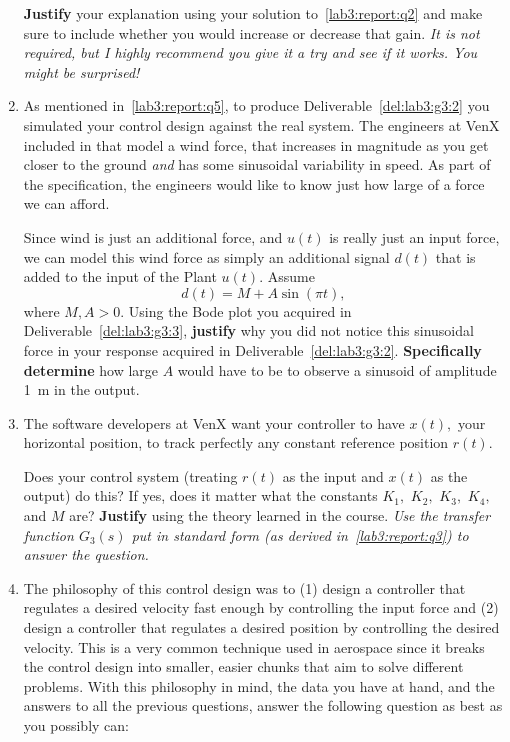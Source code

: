 \begin{deliverable}[label={lab3:report}]
\begin{enumerate}[label={(\arabic*)}]
{      \textbf{Justify} your explanation using your solution to~\ref{lab3:report:q2} and make sure to include whether you would increase or decrease that gain.
      \emph{It is not required, but I highly recommend you give it a try and see if it works. You might be surprised!}
      \label{lab3:report:q4}
    }
    \item{%
      As mentioned in~\ref{lab3:report:q5}, to produce Deliverable~\ref{del:lab3:g3:2} you simulated your control design against the real system.
      The engineers at VenX included in that model a wind force, that increases in magnitude as you get closer to the ground \emph{and} has some sinusoidal variability in speed.
      As part of the specification, the engineers would like to know just how large of a force we can afford.

      Since wind is just an additional force, and \(u(t)\) is really just an input force, we can model this wind force as simply an additional signal \(d(t)\) that is added to the input of the Plant \(u(t).\)
      Assume
      \[
        d(t) = M + A\sin\left(\pi t\right),
      \]
      where \(M, A > 0\).
      Using the Bode plot you acquired in Deliverable~\ref{del:lab3:g3:3},
      \textbf{justify} why you did not notice this sinusoidal force in your response acquired in Deliverable~\ref{del:lab3:g3:2}.
      \textbf{Specifically determine} how large \(A\) would have to be to observe a sinusoid of amplitude \SI{1}{m} in the output.
      \label{lab3:report:q5}
    }
    \item{%
      The software developers at VenX want your controller to have \(x(t),\) your horizontal position, to track perfectly any constant reference position \(r(t).\)

      Does your control system (treating \(r(t)\) as the input and \(x(t)\) as the output) do this?
      If yes, does it matter what the constants \(K_1,\) \(K_2,\) \(K_3,\) \(K_4,\) and \(M\) are?
      \textbf{Justify} using the theory learned in the course.
      \emph{Use the transfer function \(G_3(s)\) put in standard form (as derived in~\ref{lab3:report:q3}) to answer the question.}
      \label{lab3:report:q6}
    }
    \item{%
      The philosophy of this control design was to (1) design a controller that regulates a desired velocity fast enough by controlling the input force and (2) design a controller that regulates a desired position by controlling the desired velocity.
      This is a very common technique used in aerospace since it breaks the control design into smaller, easier chunks that aim to solve different problems.
      With this philosophy in mind, the data you have at hand, and the answers to all the previous questions, answer the following question as best as you possibly can:

}
\end{enumerate}
\end{deliverable}
